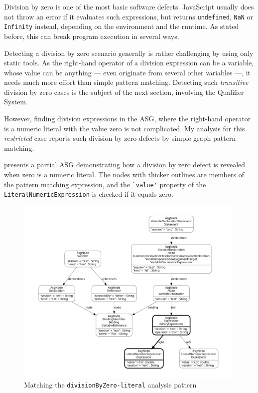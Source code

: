 Division by zero is one of the most basic software defects. JavaScript usually does not throw an error if it evaluates such expressions, but returns \lstinline{undefined}, \lstinline{NaN} or \lstinline{Infinity} instead, depending on the environment and the runtime. As stated before, this can break program execution in several ways.

Detecting a division by zero scenario generally is rather challenging by using only static tools. As the right-hand operator of a division expression can be a variable, whose value can be anything — even originate from several other variables —, it needs much more effort than simple pattern matching. Detecting such \emph{transitive} division by zero cases is the subject of the next section, involving the Qualifier System.

However, finding division expressions in the ASG, where the right-hand operator is a numeric literal with the value zero is not complicated. My analysis for this \emph{restricted} case reports such division by zero defects by simple graph pattern matching.

 presents a partial ASG demonstrating how a division by zero defect is revealed when zero is a numeric literal. The nodes with thicker outlines are members of the pattern matching expression, and the \lstinline{`value'} property of the \lstinline{LiteralNumericExpression} is checked if it equals zero.

\begin{figure}[!htb]
	\centering
	\includegraphics[height=91mm, trim=12mm 12mm 12mm 12mm,clip]{figures/analysis_divisionByZero_simple.pdf}
	\caption{Matching the \lstinline{divisionByZero-literal} analysis pattern}
	\label{fig:analysis-divisionbyzero-simple}
\end{figure}


